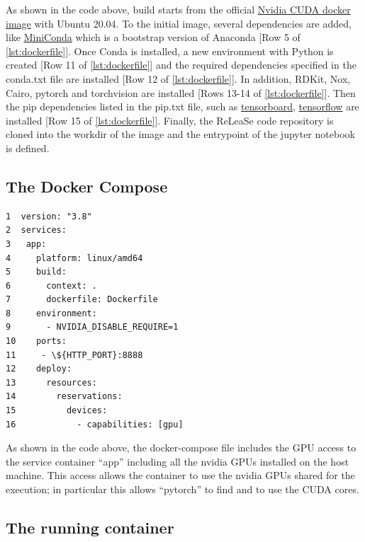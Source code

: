 \documentclass[a4paper]{article}
\begin{document}
As shown in the code above, build starts from the official \href{https://hub.docker.com/r/nvidia/cuda}{Nvidia CUDA docker image} with Ubuntu 20.04. To the initial image, several dependencies are added, like \href{https://docs.conda.io/en/latest/miniconda.html}{MiniConda} which is a bootstrap version of Anaconda [Row 5 of \ref{lst:dockerfile}].
Once Conda is installed, a new environment with Python is created [Row 11 of \ref{lst:dockerfile}] and the required dependencies specified in the conda.txt file are installed [Row 12 of \ref{lst:dockerfile}]. In addition, RDKit, Nox, Cairo, pytorch and torchvision are installed [Rows 13-14 of \ref{lst:dockerfile}]. 
Then the pip dependencies listed in the pip.txt file, such as \href{https://www.tensorflow.org/tensorboard}{tensorboard}, \href{https://www.tensorflow.org/}{tensorflow} are installed [Row 15 of \ref{lst:dockerfile}].
Finally, the ReLeaSe code repository is cloned into the workdir of the image and the entrypoint of the jupyter notebook is defined.

\subsection{The Docker Compose}\label{sec:The Docker Compose}

\begin{lstlisting}
1  version: "3.8"
2  services:
3   app:
4     platform: linux/amd64
5     build:
6       context: .
7       dockerfile: Dockerfile
8     environment:
9       - NVIDIA_DISABLE_REQUIRE=1
10    ports:
11     - \${HTTP_PORT}:8888
12    deploy:
13      resources:
14        reservations:
15          devices:
16            - capabilities: [gpu]
\end{lstlisting}

As shown in the code above, the docker-compose file includes the GPU access \cite{gpu-support} to the service container “app” including all the nvidia GPUs installed on the host machine. This access allows the container to use the nvidia GPUs shared for the execution; in particular this allows “pytorch” to find and to use the CUDA cores.

\subsection{The running container}\label{sec:The running container}
\end{document}
